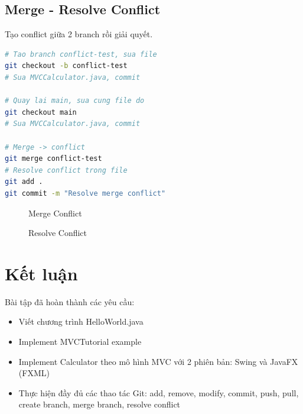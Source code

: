 \documentclass[12pt,a4paper]{article}
\begin{document}
\subsection{Merge - Resolve Conflict}
Tạo conflict giữa 2 branch rồi giải quyết.

\begin{lstlisting}[language=bash]
# Tao branch conflict-test, sua file
git checkout -b conflict-test
# Sua MVCCalculator.java, commit

# Quay lai main, sua cung file do
git checkout main
# Sua MVCCalculator.java, commit

# Merge -> conflict
git merge conflict-test
# Resolve conflict trong file
git add .
git commit -m "Resolve merge conflict"
\end{lstlisting}

\begin{figure}[H]
    \centering
    \caption{Merge Conflict}
\end{figure}

\begin{figure}[H]
    \centering
    \caption{Resolve Conflict}
\end{figure}

\section{Kết luận}

Bài tập đã hoàn thành các yêu cầu:
\begin{itemize}
    \item Viết chương trình HelloWorld.java
    \item Implement MVCTutorial example
    \item Implement Calculator theo mô hình MVC với 2 phiên bản: Swing và JavaFX (FXML)
    \item Thực hiện đầy đủ các thao tác Git: add, remove, modify, commit, push, pull, create branch, merge branch, resolve conflict
\end{itemize}
\end{document}

